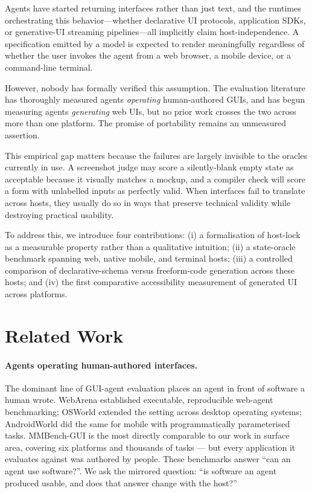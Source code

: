 \documentclass{article}
\begin{document}
Agents have started returning interfaces rather than just text, and the runtimes orchestrating this behavior---whether declarative UI protocols, application SDKs, or generative-UI streaming pipelines---all implicitly claim host-independence. A specification emitted by a model is expected to render meaningfully regardless of whether the user invokes the agent from a web browser, a mobile device, or a command-line terminal.

However, nobody has formally verified this assumption. The evaluation literature has thoroughly measured agents \emph{operating} human-authored GUIs, and has begun measuring agents \emph{generating} web UIs, but no prior work crosses the two across more than one platform. The promise of portability remains an unmeasured assertion.

This empirical gap matters because the failures are largely invisible to the oracles currently in use. A screenshot judge may score a silently-blank empty state as acceptable because it visually matches a mockup, and a compiler check will score a form with unlabelled inputs as perfectly valid. When interfaces fail to translate across hosts, they usually do so in ways that preserve technical validity while destroying practical usability.

To address this, we introduce four contributions: (i) a formalisation of host-lock as a measurable property rather than a qualitative intuition; (ii) a state-oracle benchmark spanning web, native mobile, and terminal hosts; (iii) a controlled comparison of declarative-schema versus freeform-code generation across these hosts; and (iv) the first comparative accessibility measurement of generated UI across platforms.

\section{Related Work}
\label{sec:related}

\paragraph{Agents operating human-authored interfaces.}
The dominant line of GUI-agent evaluation places an agent in front of software a
human wrote. WebArena \cite{webarena2024} established executable, reproducible
web-agent benchmarking; OSWorld \cite{osworld2024} extended the setting across
desktop operating systems; AndroidWorld \cite{androidworld2025} did the same for
mobile with programmatically parameterised tasks. MMBench-GUI
\cite{mmbenchgui2025} is the most directly comparable to our work in surface
area, covering six platforms and thousands of tasks --- but every application it
evaluates against was authored by people. These benchmarks answer ``can an agent
use software?''. We ask the mirrored question: ``is software an agent produced
usable, and does that answer change with the host?''
\end{document}
